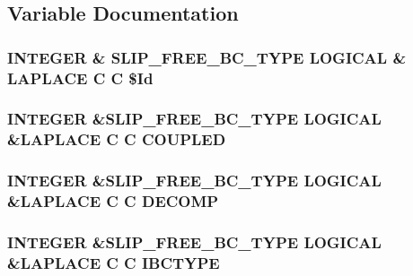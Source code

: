 \subsection{Variable Documentation}
\hypertarget{flags_8com_ae60767b8a00a3d5b1a9e070e70af7b83}{
\subsubsection[{\$\-Id}]{\setlength{\rightskip}{0pt plus 5cm}I\-N\-T\-E\-G\-E\-R \& {\bf S\-L\-I\-P\-\_\-\-F\-R\-E\-E\-\_\-\-B\-C\-\_\-\-T\-Y\-P\-E} L\-O\-G\-I\-C\-A\-L \& L\-A\-P\-L\-A\-C\-E C C \$Id}}\label{flags_8com_ae60767b8a00a3d5b1a9e070e70af7b83}
\hypertarget{flags_8com_ab547235acca8df0c0afedd7ec0e93f24}{
\subsubsection[{C\-O\-U\-P\-L\-E\-D}]{\setlength{\rightskip}{0pt plus 5cm}I\-N\-T\-E\-G\-E\-R \&{\bf S\-L\-I\-P\-\_\-\-F\-R\-E\-E\-\_\-\-B\-C\-\_\-\-T\-Y\-P\-E} L\-O\-G\-I\-C\-A\-L \&L\-A\-P\-L\-A\-C\-E C C C\-O\-U\-P\-L\-E\-D}}\label{flags_8com_ab547235acca8df0c0afedd7ec0e93f24}
\hypertarget{flags_8com_a2d201f6361052b3dba0b5364e26a9321}{
\subsubsection[{D\-E\-C\-O\-M\-P}]{\setlength{\rightskip}{0pt plus 5cm}I\-N\-T\-E\-G\-E\-R \&{\bf S\-L\-I\-P\-\_\-\-F\-R\-E\-E\-\_\-\-B\-C\-\_\-\-T\-Y\-P\-E} L\-O\-G\-I\-C\-A\-L \&L\-A\-P\-L\-A\-C\-E C C D\-E\-C\-O\-M\-P}}\label{flags_8com_a2d201f6361052b3dba0b5364e26a9321}
\hypertarget{flags_8com_a1ab85a12f47d078d88be0df3c8e032f5}{
\subsubsection[{I\-B\-C\-T\-Y\-P\-E}]{\setlength{\rightskip}{0pt plus 5cm}I\-N\-T\-E\-G\-E\-R \&{\bf S\-L\-I\-P\-\_\-\-F\-R\-E\-E\-\_\-\-B\-C\-\_\-\-T\-Y\-P\-E} L\-O\-G\-I\-C\-A\-L \&L\-A\-P\-L\-A\-C\-E C C I\-B\-C\-T\-Y\-P\-E}}\label{flags_8com_a1ab85a12f47d078d88be0df3c8e032f5}
